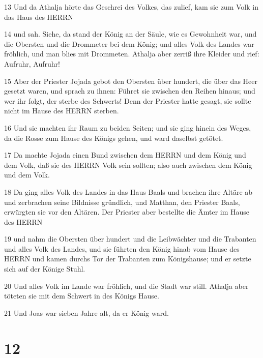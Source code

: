 \par 13 Und da Athalja hörte das Geschrei des Volkes, das zulief, kam sie zum Volk in das Haus des HERRN
\par 14 und sah. Siehe, da stand der König an der Säule, wie es Gewohnheit war, und die Obersten und die Drommeter bei dem König; und alles Volk des Landes war fröhlich, und man blies mit Drommeten. Athalja aber zerriß ihre Kleider und rief: Aufruhr, Aufruhr!
\par 15 Aber der Priester Jojada gebot den Obersten über hundert, die über das Heer gesetzt waren, und sprach zu ihnen: Führet sie zwischen den Reihen hinaus; und wer ihr folgt, der sterbe des Schwerts! Denn der Priester hatte gesagt, sie sollte nicht im Hause des HERRN sterben.
\par 16 Und sie machten ihr Raum zu beiden Seiten; und sie ging hinein des Weges, da die Rosse zum Hause des Königs gehen, und ward daselbst getötet.
\par 17 Da machte Jojada einen Bund zwischen dem HERRN und dem König und dem Volk, daß sie des HERRN Volk sein sollten; also auch zwischen dem König und dem Volk.
\par 18 Da ging alles Volk des Landes in das Haus Baals und brachen ihre Altäre ab und zerbrachen seine Bildnisse gründlich, und Matthan, den Priester Baals, erwürgten sie vor den Altären. Der Priester aber bestellte die Ämter im Hause des HERRN
\par 19 und nahm die Obersten über hundert und die Leibwächter und die Trabanten und alles Volk des Landes, und sie führten den König hinab vom Hause des HERRN und kamen durchs Tor der Trabanten zum Königshause; und er setzte sich auf der Könige Stuhl.
\par 20 Und alles Volk im Lande war fröhlich, und die Stadt war still. Athalja aber töteten sie mit dem Schwert in des Königs Hause.
\par 21 Und Joas war sieben Jahre alt, da er König ward.

\chapter{12}

